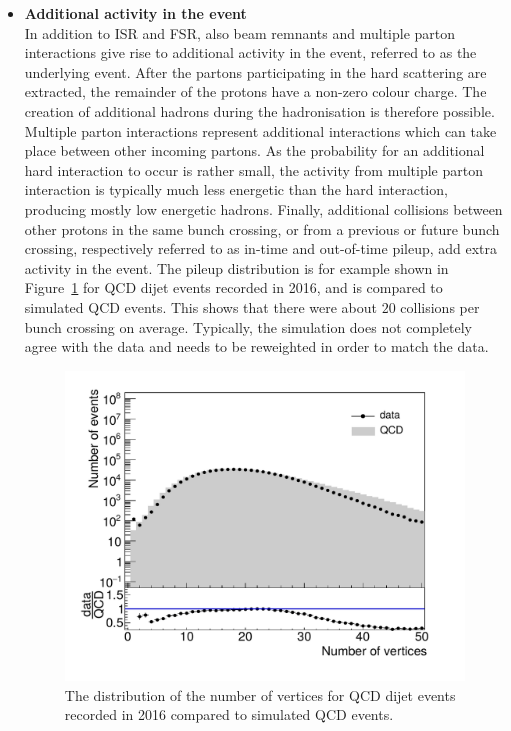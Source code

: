 \begin{itemize}
\item[] \textbf{Additional activity in the event}\\
In addition to \ac{ISR} and \ac{FSR}, also beam remnants and multiple parton interactions give rise to additional activity in the event, referred to as the underlying event. After the partons participating in the hard scattering are extracted, the remainder of the protons have a non-zero colour charge. The creation of additional hadrons during the hadronisation is therefore possible. Multiple parton interactions represent additional interactions which can take place between other incoming partons. As the probability for an additional hard interaction to occur is rather small, the activity from multiple parton interaction is typically much less energetic than the hard interaction, producing mostly low energetic hadrons. Finally, additional collisions between other protons in the same bunch crossing, or from a previous or future bunch crossing, respectively referred to as in-time and out-of-time pileup, add extra activity in the event. The pileup distribution is for example shown in Figure~\ref{fig:pileup} for QCD dijet events recorded in 2016, and is compared to simulated QCD events. This shows that there were about $20$ collisions per bunch crossing on average. Typically, the simulation does not completely agree with the data and needs to be reweighted in order to match the data.

\begin{figure}[ht]
  \centering
 \includegraphics[width=.75\textwidth]{pileup.pdf} 
 \caption{The distribution of the number of vertices for \ac{QCD} dijet events recorded in 2016 compared to simulated \ac{QCD} events.}
 \label{fig:pileup}
\end{figure}
 \end{itemize}

